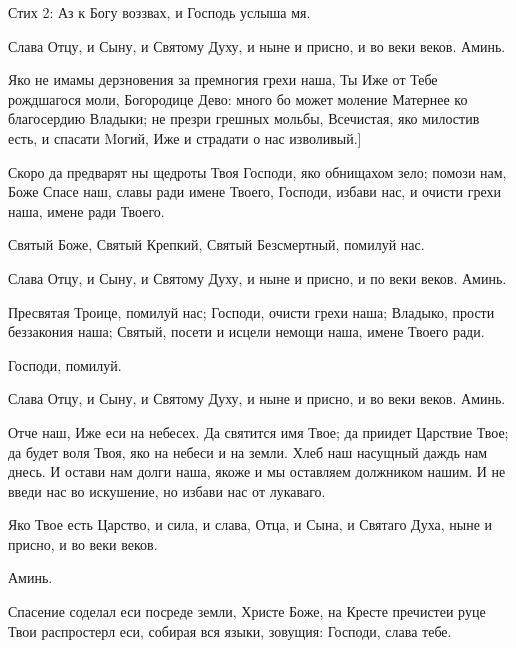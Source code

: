 \begin{mymulticols}
Стих 2: Аз к Богу воззвах, и Господь услыша мя.



Слава Отцу, и Сыну, и Святому Духу, и ныне и присно, и во веки веков. Аминь.

 Яко не имамы дерзновения за премногия грехи наша, Ты Иже от Тебе рождшагося моли, Богородице Дево: много бо может моление Матернее ко благосердию Владыки; не презри грешных мольбы, Всечистая, яко милостив есть, и спасати Mогий, Иже и страдати о нас изволивый.]





Скоро да предварят ны щедроты Твоя Господи, яко обнищахом зело; помози нам, Боже Спасе наш, славы ради имене Твоего, Господи, избави нас, и очисти грехи наша, имене ради Твоего.



Святый Боже, Святый Крепкий, Святый Безсмертный, помилуй нас. 

Слава Отцу, и Сыну, и Святому Духу, и ныне и присно, и по веки веков. Аминь.



Пресвятая Троице, помилуй нас; Господи, очисти грехи наша; Владыко, прости беззакония наша; Святый, посети и исцели немощи наша, имене Твоего ради.



Господи, помилуй. 

Слава Отцу, и Сыну, и Святому Духу, и ныне и присно, и во веки веков. Аминь.

Отче наш, Иже еси на небесех. Да святится имя Твое; да приидет Царствие Твое; да будет воля Твоя, яко на небеси и на земли. Хлеб наш насущный даждь нам днесь. И остави нам долги наша, якоже и мы оставляем должником нашим. И не введи нас во искушение, но избави нас от лукаваго.

 Яко Твое есть Царство, и сила, и слава, Отца, и Сына, и Святаго Духа, ныне и присно, и во веки веков.

 Аминь.






\myemph{[Если Великий пост "--- тропари, глас 2:}

Спасение соделал еси посреде земли, Христе Боже, на Кресте пречистеи руце Твои распростерл еси, собирая вся языки, зовущия: Господи, слава тебе.




\end{mymulticols}
